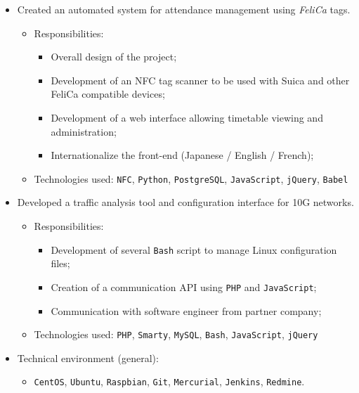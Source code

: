 \documentclass[11pt,a4paper,sans]{moderncv}        %
\newcommand{\techno}{\texttt}
\begin{document}
{\begin{itemize}
\begin{itemize}
\begin{itemize}
            \end{itemize}
        \item Technologies used: \techno{C++}
    \end{itemize}
\item Created an automated system for attendance management using \emph{FeliCa} tags.
    \begin{itemize}%
        \item Responsibilities:
            \begin{itemize}%
                \item Overall design of the project;
                \item Development of an NFC tag scanner to be used with Suica and other FeliCa compatible devices;
                \item Development of a web interface allowing timetable viewing and administration;
                \item Internationalize the front-end (Japanese / English / French);
            \end{itemize}
        \item Technologies used: \techno{NFC}, \techno{Python}, \techno{PostgreSQL}, \techno{JavaScript}, \techno{jQuery}, \techno{Babel}
    \end{itemize}
\item Developed a traffic analysis tool and configuration interface for 10G networks.
    \begin{itemize}%
        \item Responsibilities:
            \begin{itemize}%
                \item Development of several \techno{Bash} script to manage Linux configuration files;
                \item Creation of a communication API using \techno{PHP} and \techno{JavaScript};
                \item Communication with software engineer from partner company;
            \end{itemize}
        \item Technologies used: \techno{PHP}, \techno{Smarty}, \techno{MySQL}, \techno{Bash}, \techno{JavaScript}, \techno{jQuery}
    \end{itemize}
\item Technical environment (general):
    \begin{itemize}%
        \item \techno{CentOS}, \techno{Ubuntu}, \techno{Raspbian}, \techno{Git}, \techno{Mercurial}, \techno{Jenkins}, \techno{Redmine}.
    \end{itemize}
\end{itemize}
}
\end{document}
